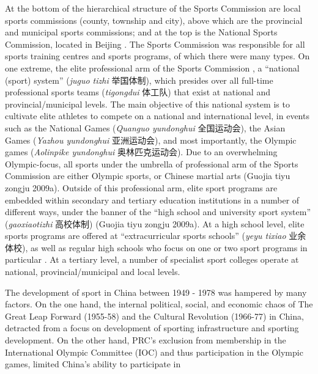   At the bottom of the hierarchical structure of the Sports Commission are local sports commissions (county, township and city), above which are the provincial and municipal sports commissions; and at the top is the National Sports Commission, located in Beijing \citep[59]{Brownell1995}.  The Sports Commission was responsible for all sports training centres and sports programs, of which there were many types.  On one extreme, the elite professional arm of the Sports Commission , a ``national (sport) system'' (\textit{juguo tizhi} 举国体制), which presides over all full-time professional sports teams (\textit{tigongdui} 体工队) that exist at national and provincial/municipal levels.  The main objective of this national system is to cultivate elite athletes to compete on a national and international level, in events such as the National Games (\textit{Quanguo yundonghui} 全国运动会), the Asian Games (\textit{Yazhou yundonghui} 亚洲运动会), and most importantly, the Olympic games (\textit{Aolinpike yundonghui} 奥林匹克运动会).  Due to an overwhelming Olympic-focus, all sports under the umbrella of professional arm of the Sports Commission are either Olympic sports, or Chinese martial arts (Guojia tiyu zongju 2009a).  Outside of this professional arm, elite sport programs are embedded within secondary and tertiary education institutions in a number of different ways, under the banner of the ``high school and university sport system'' (\textit{gaoxiaotizhi} 高校体制) (Guojia tiyu zongju 2009a).  At a high school level, elite sports programs are offered at ``extracurricular sports schools'' (\textit{yeyu tixiao} 业余体校), as well as regular high schools who focus on one or two sport programs in particular \citep[59]{Brownell1995}. At a tertiary level, a number of specialist sport colleges operate at national, provincial/municipal and local levels.


  The development of sport in China between 1949 - 1978 was hampered by many factors.  On the one hand, the internal political, social, and economic chaos of The Great Leap Forward (1955-58) and the Cultural Revolution (1966-77) in China, detracted from a focus on development of sporting infrastructure and sporting development.  On the other hand, PRC's exclusion from membership in the International Olympic Committee (IOC) and thus participation in the Olympic games, limited China's ability to participate in


